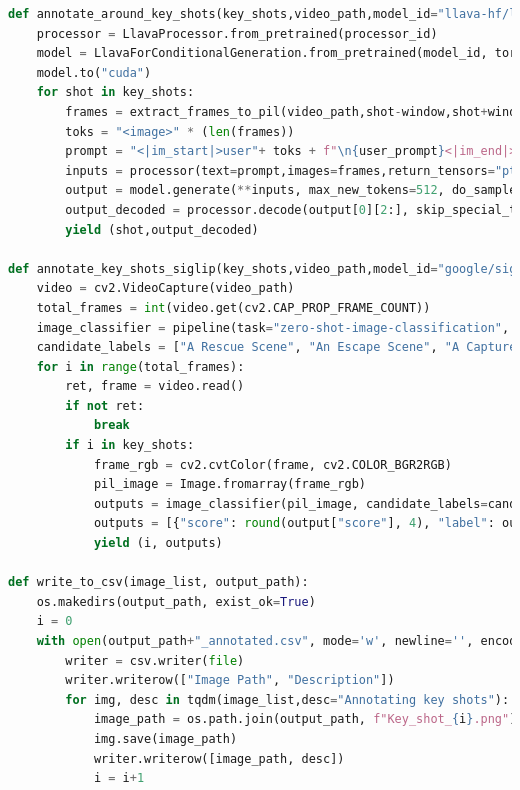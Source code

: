 \documentclass[12pt]{report}
\begin{document}
\begin{lstlisting}[language=Python,caption={LLM Inference Code}]
def annotate_around_key_shots(key_shots,video_path,model_id="llava-hf/llava-interleave-qwen-7b-hf",processor_id="llava-hf/llava-interleave-qwen-0.5b-hf",user_prompt="What is this scene about?",window=5):
    processor = LlavaProcessor.from_pretrained(processor_id)
    model = LlavaForConditionalGeneration.from_pretrained(model_id, torch_dtype=torch.float16,load_in_4bit=True)
    model.to("cuda")
    for shot in key_shots:
        frames = extract_frames_to_pil(video_path,shot-window,shot+window)
        toks = "<image>" * (len(frames))
        prompt = "<|im_start|>user"+ toks + f"\n{user_prompt}<|im_end|><|im_start|>assistant"
        inputs = processor(text=prompt,images=frames,return_tensors="pt").to(model.device, model.dtype)
        output = model.generate(**inputs, max_new_tokens=512, do_sample=False)
        output_decoded = processor.decode(output[0][2:], skip_special_tokens=True)[len(user_prompt)+10:]
        yield (shot,output_decoded)

def annotate_key_shots_siglip(key_shots,video_path,model_id="google/siglip-base-patch16-224"):
    video = cv2.VideoCapture(video_path)
    total_frames = int(video.get(cv2.CAP_PROP_FRAME_COUNT))
    image_classifier = pipeline(task="zero-shot-image-classification", model="google/siglip-base-patch16-224")
    candidate_labels = ["A Rescue Scene", "An Escape Scene", "A Capture Scene", "An Heist Scene", "A Fight Scene","A Pursuit Scene","Not a Resue scene neither an escape scene nor a capture scene nor a heist scene nor a fight scene nor a pursuit scene"]
    for i in range(total_frames):
        ret, frame = video.read()
        if not ret:
            break
        if i in key_shots:
            frame_rgb = cv2.cvtColor(frame, cv2.COLOR_BGR2RGB)
            pil_image = Image.fromarray(frame_rgb)
            outputs = image_classifier(pil_image, candidate_labels=candidate_labels)
            outputs = [{"score": round(output["score"], 4), "label": output["label"] } for output in outputs]
            yield (i, outputs)

def write_to_csv(image_list, output_path):
    os.makedirs(output_path, exist_ok=True)
    i = 0
    with open(output_path+"_annotated.csv", mode='w', newline='', encoding='utf-8') as file:
        writer = csv.writer(file)
        writer.writerow(["Image Path", "Description"])
        for img, desc in tqdm(image_list,desc="Annotating key shots"):
            image_path = os.path.join(output_path, f"Key_shot_{i}.png")
            img.save(image_path)
            writer.writerow([image_path, desc])
            i = i+1
            

\end{lstlisting}
\end{document}
